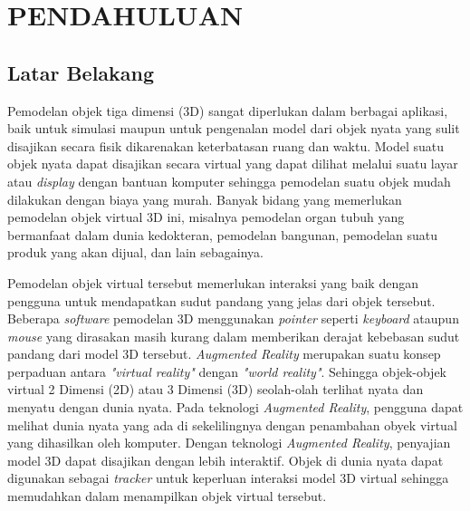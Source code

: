 \chapter{PENDAHULUAN} %
\label{chap:pendahuluan} 

\section{Latar Belakang} %
\label{sec:latar_belakang} 
Pemodelan objek tiga dimensi (3D) sangat diperlukan dalam berbagai aplikasi, baik untuk simulasi maupun untuk pengenalan model dari objek nyata yang sulit disajikan secara fisik dikarenakan keterbatasan ruang dan waktu. Model suatu objek nyata dapat disajikan secara virtual yang dapat dilihat melalui suatu layar atau \textit{display} dengan bantuan komputer sehingga pemodelan suatu objek mudah dilakukan dengan biaya yang murah. Banyak bidang yang memerlukan pemodelan objek virtual 3D ini, misalnya pemodelan organ tubuh yang bermanfaat dalam dunia kedokteran, pemodelan bangunan, pemodelan suatu produk yang akan dijual, dan lain sebagainya.

Pemodelan objek virtual tersebut memerlukan interaksi yang baik dengan pengguna untuk mendapatkan sudut pandang yang jelas dari objek tersebut. Beberapa \textit{software} pemodelan 3D menggunakan \textit{pointer} seperti \textit{keyboard} ataupun \textit{mouse} yang dirasakan masih kurang dalam memberikan derajat kebebasan sudut pandang dari model 3D tersebut. \textit{Augmented Reality} merupakan suatu konsep perpaduan antara \textit{"virtual reality"} dengan \textit{"world reality"}. Sehingga objek-objek virtual 2 Dimensi (2D) atau 3 Dimensi (3D) seolah-olah terlihat nyata dan menyatu dengan dunia nyata. Pada teknologi \textit{Augmented Reality}, pengguna dapat melihat dunia nyata yang ada di sekelilingnya dengan penambahan obyek virtual yang dihasilkan oleh komputer.  Dengan teknologi \textit{Augmented Reality}, penyajian model 3D dapat disajikan dengan lebih interaktif. Objek di dunia nyata dapat digunakan sebagai \textit{tracker} untuk keperluan interaksi model 3D virtual sehingga memudahkan dalam menampilkan objek virtual tersebut.

